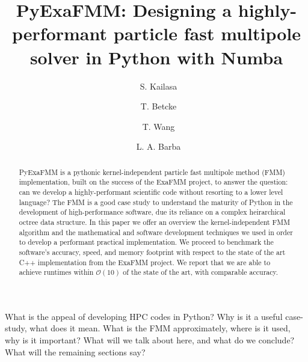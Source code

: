 \documentclass{IEEEcsmag}
\begin{document}

\title{PyExaFMM: Designing a highly-performant particle fast multipole solver in Python with Numba}

\author{\ S. Kailasa}

\author{\ T. Betcke}

\author{\ T. Wang}

\author{\ L. A. Barba}


\begin{abstract}
PyExaFMM is a pythonic kernel-independent particle fast multipole method (FMM) implementation, built on the success of the ExaFMM project, to answer the question: can we develop a highly-performant scientific code without resorting to a lower level language? The FMM is a good case study to understand the maturity of Python in the development of high-performance software, due its reliance on a complex heirarchical octree data structure. In this paper we offer an overview the kernel-independent FMM algorithm and the mathematical and software development techniques we used in order to develop a performant practical implementation. We proceed to benchmark the software's accuracy, speed, and memory footprint with respect to the state of the art C++ implementation from the ExaFMM project. We report that we are able to achieve runtimes within $\mathcal{O}(10)$ of the state of the art, with comparable accuracy.

\end{abstract}

\maketitle

 What is the appeal of developing HPC codes in Python? Why is it a useful case-study, what does it mean. What is the FMM approximately, where is it used, why is it important? What will we talk about here, and what do we conclude? What will the remaining sections say?

\cite{Ying2004}
\end{document}
